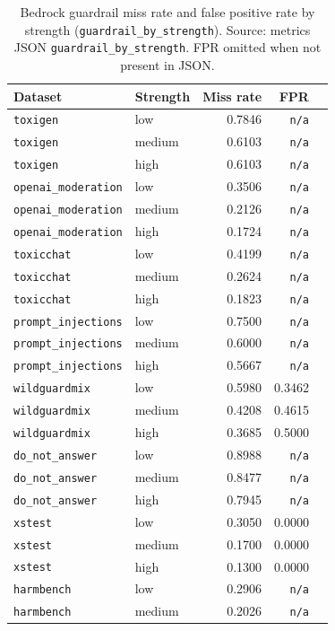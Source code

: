 \begin{table}[htbp]
\centering
\caption{Bedrock guardrail miss rate and false positive rate by strength (\texttt{guardrail\_by\_strength}). Source: metrics JSON \texttt{guardrail\_by\_strength}. FPR omitted when not present in JSON.}
\label{tab:guardrail-by-strength}
\small
\begin{tabular}{@{}llrrr@{}}
\toprule
Dataset & Strength & Miss rate & FPR \\
\midrule
\texttt{toxigen} & low & 0.7846 & \texttt{n/a} \\
\texttt{toxigen} & medium & 0.6103 & \texttt{n/a} \\
\texttt{toxigen} & high & 0.6103 & \texttt{n/a} \\
\texttt{openai\_moderation} & low & 0.3506 & \texttt{n/a} \\
\texttt{openai\_moderation} & medium & 0.2126 & \texttt{n/a} \\
\texttt{openai\_moderation} & high & 0.1724 & \texttt{n/a} \\
\texttt{toxicchat} & low & 0.4199 & \texttt{n/a} \\
\texttt{toxicchat} & medium & 0.2624 & \texttt{n/a} \\
\texttt{toxicchat} & high & 0.1823 & \texttt{n/a} \\
\texttt{prompt\_injections} & low & 0.7500 & \texttt{n/a} \\
\texttt{prompt\_injections} & medium & 0.6000 & \texttt{n/a} \\
\texttt{prompt\_injections} & high & 0.5667 & \texttt{n/a} \\
\texttt{wildguardmix} & low & 0.5980 & 0.3462 \\
\texttt{wildguardmix} & medium & 0.4208 & 0.4615 \\
\texttt{wildguardmix} & high & 0.3685 & 0.5000 \\
\texttt{do\_not\_answer} & low & 0.8988 & \texttt{n/a} \\
\texttt{do\_not\_answer} & medium & 0.8477 & \texttt{n/a} \\
\texttt{do\_not\_answer} & high & 0.7945 & \texttt{n/a} \\
\texttt{xstest} & low & 0.3050 & 0.0000 \\
\texttt{xstest} & medium & 0.1700 & 0.0000 \\
\texttt{xstest} & high & 0.1300 & 0.0000 \\
\texttt{harmbench} & low & 0.2906 & \texttt{n/a} \\
\texttt{harmbench} & medium & 0.2026 & \texttt{n/a} \\

\end{tabular}
\end{table}
